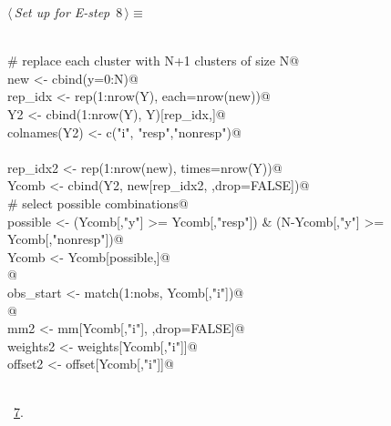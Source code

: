 \documentclass[reqno]{amsart}
\renewcommand{\NWtarget}[2]{\hypertarget{#1}{#2}}
\renewcommand{\NWlink}[2]{\hyperlink{#1}{#2}}
\begin{document}
\begin{flushleft} \small\label{scrap8}\raggedright\small
\NWtarget{nuweb8}{} $\langle\,${\itshape Set up for E-step}\nobreak\ {\footnotesize {8}}$\,\rangle\equiv$
\vspace{-1ex}
\begin{list}{}{} \item
\mbox{}\verb@@\\
\mbox{}\verb@  # replace each cluster with N+1 clusters of size N@\\
\mbox{}\verb@  new <- cbind(y=0:N)@\\
\mbox{}\verb@  rep_idx <- rep(1:nrow(Y), each=nrow(new))@\\
\mbox{}\verb@  Y2 <- cbind(1:nrow(Y), Y)[rep_idx,]@\\
\mbox{}\verb@  colnames(Y2) <- c("i", "resp","nonresp")@\\
\mbox{}\verb@@\\
\mbox{}\verb@  rep_idx2 <- rep(1:nrow(new), times=nrow(Y))@\\
\mbox{}\verb@  Ycomb <- cbind(Y2, new[rep_idx2, ,drop=FALSE])@\\
\mbox{}\verb@  # select possible combinations@\\
\mbox{}\verb@  possible <- (Ycomb[,"y"] >= Ycomb[,"resp"]) & (N-Ycomb[,"y"] >= Ycomb[,"nonresp"])@\\
\mbox{}\verb@  Ycomb <- Ycomb[possible,]@\\
\mbox{}\verb@  @\\
\mbox{}\verb@  obs_start <- match(1:nobs, Ycomb[,"i"])@\\
\mbox{}\verb@ @\\
\mbox{}\verb@  mm2 <- mm[Ycomb[,"i"], ,drop=FALSE]@\\
\mbox{}\verb@  weights2 <- weights[Ycomb[,"i"]]@\\
\mbox{}\verb@  offset2 <- offset[Ycomb[,"i"]]@\\
\mbox{}\verb@@\\
\mbox{}\verb@@{\NWsep}
\end{list}
\vspace{-1.5ex}
\footnotesize
\begin{list}{}{\setlength{\itemsep}{-\parsep}\setlength{\itemindent}{-\leftmargin}}
\item \NWtxtMacroRefIn\ \NWlink{nuweb7}{7}.

\item{}
\end{list}
\vspace{4ex}
\end{flushleft}
\end{document}
